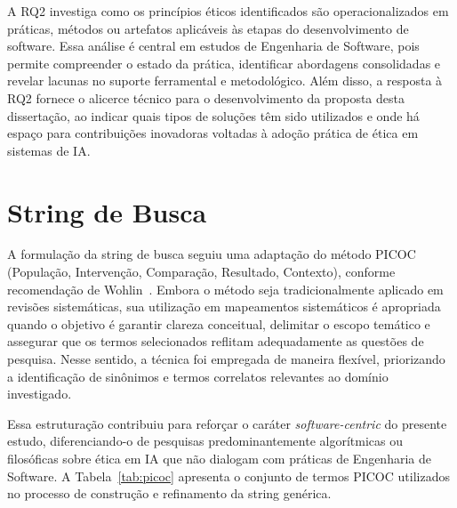 A RQ2 investiga como os princípios éticos identificados são operacionalizados em práticas, métodos ou artefatos aplicáveis às etapas do desenvolvimento de software. Essa análise é central em estudos de Engenharia de Software, pois permite compreender o estado da prática, identificar abordagens consolidadas e revelar lacunas no suporte ferramental e metodológico. Além disso, a resposta à RQ2 fornece o alicerce técnico para o desenvolvimento da proposta desta dissertação, ao indicar quais tipos de soluções têm sido utilizados e onde há espaço para contribuições inovadoras voltadas à adoção prática de ética em sistemas de IA.


\section{String de Busca}

A formulação da string de busca seguiu uma adaptação do método PICOC (População, Intervenção, Comparação, Resultado, Contexto), conforme recomendação de Wohlin~\cite{Wohlin2012}. Embora o método seja tradicionalmente aplicado em revisões sistemáticas, sua utilização em mapeamentos sistemáticos é apropriada quando o objetivo é garantir clareza conceitual, delimitar o escopo temático e assegurar que os termos selecionados reflitam adequadamente as questões de pesquisa. Nesse sentido, a técnica foi empregada de maneira flexível, priorizando a identificação de sinônimos e termos correlatos relevantes ao domínio investigado.

Essa estruturação contribuiu para reforçar o caráter \textit{software-centric} do presente estudo, diferenciando-o de pesquisas predominantemente algorítmicas ou filosóficas sobre ética em IA que não dialogam com práticas de Engenharia de Software. A Tabela~\ref{tab:picoc} apresenta o conjunto de termos PICOC utilizados no processo de construção e refinamento da string genérica.

